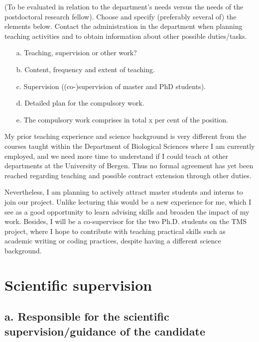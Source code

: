 \documentclass{article}
\newcommand{\guideline}[1]{{\color{color2}\itshape{#1}}}
\begin{document}
    \guideline{
        (To be evaluated in relation to the department’s needs versus the needs
        of the postdoctoral research fellow). Choose and specify (preferably
        several of) the elements below. Contact the administration in the
        department when planning teaching activities and to obtain information
        about other possible duties/tasks.

        \begin{itemize}
          \item[a.] Teaching, supervision or other work?
          \item[b.] Content, frequency and extent of teaching.
          \item[c.] Supervision ((co-)supervision of master and PhD students).
          \item[d.] Detailed plan for the compulsory work.
          \item[e.] The compulsory work comprises in total x per cent of the position.
        \end{itemize}}

    My prior teaching experience and science background is very different from
    the courses taught within the Department of Biological Sciences where I am
    currently employed, and we need more time to understand if I could teach
    at other departments at the University of Bergen. Thus no formal agreement
    has yet been reached regarding teaching and possible contract extension
    through other duties.

    Nevertheless,
    I am planning to actively attract master students and interns to join our
    project. Unlike lecturing this would be a new experience for me, which I
    see as a good opportunity to learn advising skills and broaden the impact
    of my work. Besides, I will be a co-supervisor for the two Ph.D. students
    on the TMS project, where I hope to contribute with teaching practical
    skills such as academic writing or coding practices, despite having a
    different science background.

\section{Scientific supervision}

\subsection{a. Responsible for the scientific supervision/guidance of the
            candidate}
\end{document}
